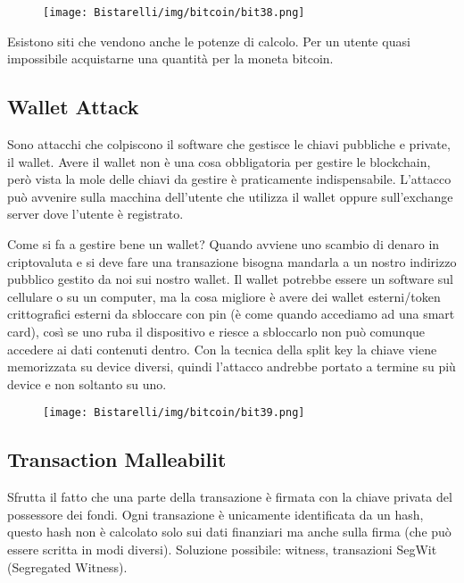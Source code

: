 \begin{figure}[H]
	\centering
    \texttt{[image: Bistarelli/img/bitcoin/bit38.png]}
\end{figure}

Esistono siti che vendono anche le potenze di calcolo. Per un utente quasi impossibile acquistarne una quantità
per la moneta bitcoin.

\subsection{Wallet Attack}

Sono attacchi che colpiscono il software che gestisce le chiavi pubbliche e private, il wallet. Avere il wallet non è
una cosa obbligatoria per gestire le blockchain, però vista la mole delle chiavi da gestire è praticamente
indispensabile. L’attacco può avvenire sulla macchina dell’utente che utilizza il wallet oppure sull’exchange server
dove l’utente è registrato.

\singlespacing

Come si fa a gestire bene un wallet?
Quando avviene uno scambio di denaro in criptovaluta e si deve fare una transazione bisogna mandarla a un
nostro indirizzo pubblico gestito da noi sui nostro wallet. Il wallet potrebbe essere un software sul cellulare o su
un computer, ma la cosa migliore è avere dei wallet esterni/token crittografici esterni da sbloccare con pin (è
come quando accediamo ad una smart card), così se uno ruba il dispositivo e riesce a sbloccarlo non può
comunque accedere ai dati contenuti dentro. Con la tecnica della split key la chiave viene memorizzata su device
diversi, quindi l’attacco andrebbe portato a termine su più device e non soltanto su uno.

\begin{figure}[H]
	\centering
    \texttt{[image: Bistarelli/img/bitcoin/bit39.png]}
\end{figure}

\subsection{Transaction Malleabilit}

Sfrutta il fatto che una parte della transazione è firmata con la chiave privata del possessore dei fondi. Ogni
transazione è unicamente identificata da un hash, questo hash non è calcolato solo sui dati finanziari ma anche
sulla firma (che può essere scritta in modi diversi). Soluzione possibile: witness, transazioni SegWit (Segregated
Witness).

